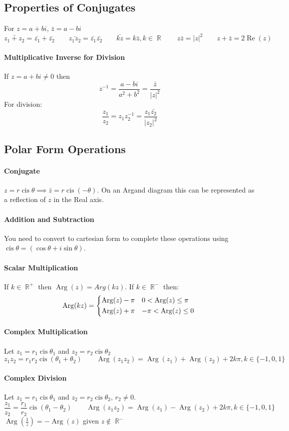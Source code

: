 \documentclass[a4paper,twoside]{article}
\DeclareMathOperator\cis{cis}
\DeclareMathOperator\Arg{Arg}
\DeclareMathOperator\Real{Re}
\DeclareMathOperator\R{\mathbb{R}}
\begin{document}
		\subsection{Properties of Conjugates}
			For $z=a+bi$, $\bar{z}=a-bi$
			\[
				\bar{z_1+z_2}=\bar{z_1}+\bar{z_2} \qquad \bar{z_1z_2}=\bar{z_1}\bar{z_2} \qquad \bar{kz}=k\bar{z},k\in\R \qquad z\bar{z}=|z|^2 \qquad z+\bar{z}=2\Real(z)
			\]
			\paragraph{Multiplicative Inverse for Division} If $z=a+bi\neq0$ then
			\[
				z^{-1}=\frac{a-bi}{a^2+b^2}=\frac{\bar{z}}{|z|^2}
			\]
			For division:
			\[
				\frac{z_1}{z_2}=z_1z_2^{-1}=\frac{z_1\bar{z_2}}{|z_2|^2}
			\]
		\subsection{Polar Form Operations}
			\paragraph{Conjugate} $z=r\cis\theta\implies\bar{z}=r\cis\left(-\theta\right)$. On an Argand diagram this can be represented as a reflection of $z$ in the Real axis.
			\paragraph{Addition and Subtraction} You need to convert to cartesian form to complete these operations using $\cis\theta=(\cos\theta+i\sin\theta)$.
			\paragraph{Scalar Multiplication} If $k\in\R^+$ then $\Arg(z)=Arg(kz)$. If $k\in\R^-$ then:
			\[
				\Arg(kz)=\begin{cases*}
					\Arg(z)-\pi & $0<\Arg(z)\leq\pi$ \\
					\Arg(z)+\pi & $-\pi<\Arg(z)\leq0$
				\end{cases*}
			\]
			\paragraph{Complex Multiplication} Let $z_1=r_1\cis\theta_1$ and $z_2=r_2\cis\theta_2$
			\[
				z_1z_2=r_1r_2\cis(\theta_1+\theta_2) \qquad \Arg(z_1z_2)=\Arg(z_1)+\Arg(z_2)+2k\pi,k\in\{-1,0,1\}
			\]
			\paragraph{Complex Division} Let $z_1=r_1\cis\theta_1$ and $z_2=r_2\cis\theta_2$, $r_2\neq0$.
			\[
				\frac{z_1}{z_2}=\frac{r_1}{r_2}\cis\left(\theta_1-\theta_2\right) \qquad \Arg(z_1z_2)=\Arg(z_1)-\Arg(z_2)+2k\pi,k\in\{-1,0,1\}
			\]
			$\Arg(\frac{1}{z})=-\Arg(z)$ given $z\notin\R^-$
\end{document}
